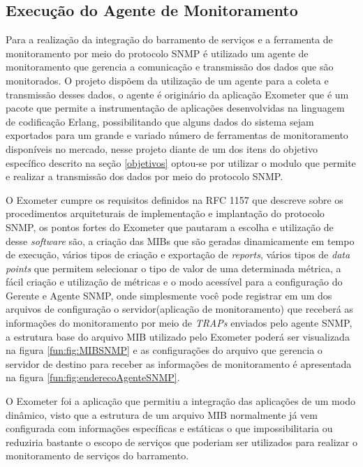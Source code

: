 {\subsection{Execução do Agente de Monitoramento}

Para a realização da integração do barramento de serviços e a ferramenta de monitoramento por meio do protocolo \acrshort{SNMP} é utilizado um agente de monitoramento que gerencia a comunicação e transmissão dos dados que são monitorados. O projeto dispõem  da utilização de um agente para a coleta e transmissão desses dados, o agente é originário da aplicação Exometer que é um pacote que permite a instrumentação de aplicações desenvolvidas na linguagem de codificação Erlang, possibilitando que alguns dados do sistema sejam exportados para um grande e variado número de ferramentas de monitoramento disponíveis no mercado\cite{exometer_core}, nesse projeto diante de um dos itens do objetivo específico descrito na seção \ref{objetivos} optou-se por utilizar o modulo que permite e realizar a transmissão dos dados por meio do protocolo \acrshort{SNMP}. 

O Exometer cumpre os requisitos definidos na \acrshort{RFC} 1157 que descreve sobre os procedimentos arquiteturais de implementação e implantação do protocolo \acrshort{SNMP}, os pontos fortes do Exometer que pautaram a escolha e utilização de desse \textit{software} são, a criação das \acrshort{MIBs} que são geradas dinamicamente em tempo de execução, vários tipos de criação e exportação de \textit{reports}, vários tipos de \textit{data points} que permitem selecionar o tipo de valor de uma determinada métrica, a fácil criação e utilização de métricas e o modo  acessível
para a configuração do Gerente e Agente \acrshort{SNMP}, onde simplesmente você pode registrar em um dos arquivos de configuração o servidor(aplicação de monitoramento) que receberá as informações do monitoramento por meio de \textit{TRAPs} enviados pelo agente \acrshort{SNMP}, a estrutura base do arquivo MIB utilizado pelo Exometer poderá ser visualizada na figura \ref{fun:fig:MIBSNMP} e as configurações do arquivo que gerencia o servidor de destino para receber as informações de monitoramento é apresentada na figura \ref{fun:fig:enderecoAgenteSNMP}. 

O Exometer foi a aplicação que permitiu a integração das aplicações de um modo dinâmico, visto que a estrutura de um arquivo MIB normalmente já vem configurada com informações específicas e estáticas o que impossibilitaria ou reduziria bastante o escopo de serviços que poderiam ser utilizados para realizar o monitoramento de serviços do barramento. 

}
